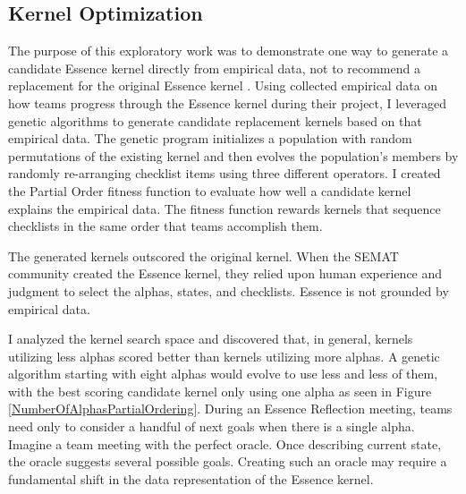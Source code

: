 \documentclass[preprint,12pt,3p]{elsarticle}
\begin{document}
\subsection{Kernel Optimization}
\label{KernelOptimization}
The purpose of this exploratory work was to demonstrate one way to generate a candidate Essence kernel directly from empirical data, not to recommend a replacement for the original Essence kernel \cite{SCSE2015}. 
Using collected empirical data on how teams progress through the Essence kernel during their project, I leveraged genetic algorithms to generate candidate replacement kernels based on that empirical data. 
The genetic program initializes a population with random permutations of the existing kernel and then evolves the population's members by randomly re-arranging checklist items using three different operators. I created the Partial Order fitness function to evaluate how well a candidate kernel explains the empirical data. The fitness function rewards kernels that sequence checklists in the same order that teams accomplish them. 


The generated kernels outscored the original kernel. When the SEMAT community created the Essence kernel, they relied upon human experience and judgment to select the alphas, states, and checklists. Essence is not grounded by empirical data. 

I analyzed the kernel search space and discovered that, in general, kernels utilizing less alphas scored better than kernels utilizing more alphas. A genetic algorithm starting with eight alphas would evolve to use less and less of them, with the best scoring candidate kernel only using one alpha as seen in Figure \ref{NumberOfAlphasPartialOrdering}. During an Essence Reflection meeting, teams need only to consider a handful of next goals when there is a single alpha. Imagine a team meeting with the perfect oracle. Once describing current state, the oracle suggests several possible goals. Creating such an oracle may require a fundamental shift in the data representation of the Essence kernel. 
\end{document}
